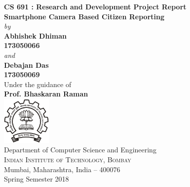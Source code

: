 \begin{titlepage}

\begin{center}

\vspace{1in}

\textup{\small {\bf CS 691 : Research and Development Project Report}}\\[0.2in]
\vspace{.25in}
\Large \textbf {Smartphone Camera Based Citizen Reporting
}\\[0.5in]
\vspace{.15in}
\normalsize \textit{by} \\
\vspace{.25in}
\textbf{Abhishek Dhiman \\ \vspace{.1in}173050066 \\}
\vspace{.15in}
\normalsize \textit{and} \\ 
\vspace{.15in}
\textbf{Debajan Das \\ \vspace{.1in}173050069 \\}
\vspace{.25in}
\vspace{.4in}
Under the guidance of\\
\vspace{.1in}
{\textbf{Prof. Bhaskaran Raman}}\\[0.2in]
\vspace{1.25in}
\includegraphics[width=0.18\textwidth]{img/logo}\\[0.1in]
\Large{Department of Computer Science and Engineering}\\
\normalsize
\textsc{Indian Institute of Technology, Bombay}\\
Mumbai, Maharashtra, India -- 400076 \\
\vspace{0.2cm}
Spring Semester 2018

\end{center}

\end{titlepage}
